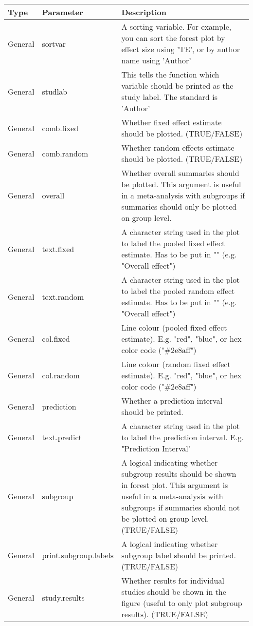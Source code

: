 \documentclass[]{book}
\theoremstyle{definition}
\theoremstyle{definition}
\theoremstyle{definition}
\theoremstyle{remark}
\begin{document}
\begin{tabular}{l|l|l}
\hline
Type & Parameter & Description\\
\hline
General & sortvar & A sorting variable. For example, you can sort the forest plot by effect size using 'TE', or by author name using 'Author'\\
\hline
General & studlab & This tells the function which variable should be printed as the study label. The standard is 'Author'\\
\hline
General & comb.fixed & Whether fixed effect estimate should be plotted. (TRUE/FALSE)\\
\hline
General & comb.random & Whether random effects estimate should be plotted. (TRUE/FALSE)\\
\hline
General & overall & Whether overall summaries should be plotted. This argument is useful in a meta-analysis with subgroups if summaries should only be plotted on group level.\\
\hline
General & text.fixed & A character string used in the plot to label the pooled fixed effect estimate. Has to be put in "" (e.g. "Overall effect")\\
\hline
General & text.random & A character string used in the plot to label the pooled random effect estimate. Has to be put in "" (e.g. "Overall effect")\\
\hline
General & col.fixed & Line colour (pooled fixed effect estimate). E.g. "red", "blue", or hex color code ("\#2e8aff")\\
\hline
General & col.random & Line colour (random fixed effect estimate). E.g. "red", "blue", or hex color code ("\#2e8aff")\\
\hline
General & prediction & Whether a prediction interval should be printed.\\
\hline
General & text.predict & A character string used in the plot to label the prediction interval. E.g. "Prediction Interval"\\
\hline
General & subgroup & A logical indicating whether subgroup results should be shown in forest plot. This argument is useful in a meta-analysis with subgroups if summaries should not be plotted on group level. (TRUE/FALSE)\\
\hline
General & print.subgroup.labels & A logical indicating whether subgroup label should be printed. (TRUE/FALSE)\\
\hline
General & study.results & Whether results for individual studies should be shown in the figure (useful to only plot subgroup results). (TRUE/FALSE)\\

\end{tabular}
\end{document}
